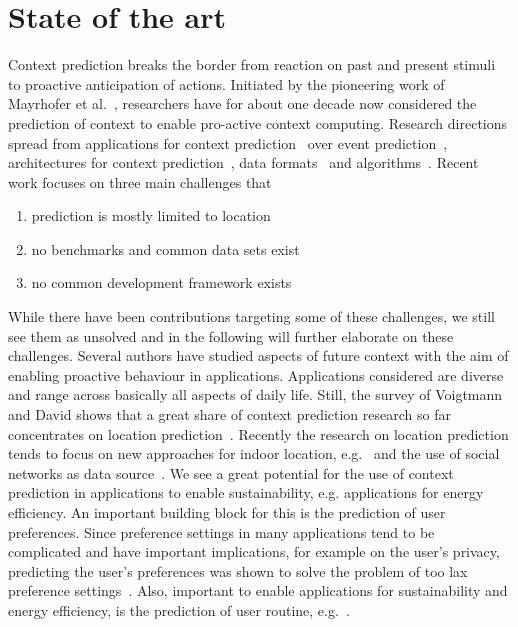 \section{State of the art}
\label{sec:stateOfTheArt}

Context prediction breaks the border from reaction on past and present stimuli to proactive anticipation of actions. 
Initiated by the pioneering work of Mayrhofer et al.~\cite{5013}, researchers have for about one decade now considered the prediction of context to enable pro-active context computing. 
Research directions spread from applications for context prediction~\cite{5035} over event prediction~\cite{5071}, architectures for context prediction~\cite{5001,5010,4027}, data formats~\cite{Prediction_Bannach_2010} and algorithms~\cite{Prediction_Intille_2006}. 
Recent work focuses on three main challenges that
\begin{enumerate}
\item prediction is mostly limited to location
\item no benchmarks and common data sets exist  
\item no common development framework exists
\end{enumerate}
While there have been contributions targeting some of these challenges, we still see them as unsolved and in the following will further elaborate on these challenges.
Several authors have studied aspects of future context with the aim of enabling proactive behaviour in applications. 
Applications considered are diverse and range across basically all aspects of daily life. 
Still, the survey of Voigtmann and David shows that a great share of context prediction research so far concentrates on location prediction~\cite{Prediction_Voigtmann_2012}. 
Recently the research on location prediction tends to focus on new approaches for indoor location, e.g.~\cite{Prediction_Ruscher_2012,Prediction_Murao_2012} and the use of social networks as data source~\cite{Prediction_Zhang_2012}. 
We see a great potential for the use of context prediction in applications to enable sustainability, e.g. applications for energy efficiency. 
An important building block for this is the prediction of user preferences. 
Since preference settings in many applications tend to be complicated and have important implications, for example on the user's privacy, predicting the user's preferences was shown to solve the problem of too lax preference settings~\cite{Prediction_Bigwood_2012}. 
Also, important to enable applications for sustainability and energy efficiency, is the prediction of user routine, e.g.~\cite{Prediction_Seiter_2012}.    

